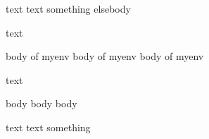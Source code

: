 text text
\if
	something
\else
	elsebody
\fi

text
\begin{myenv}
	body of myenv
	body of myenv
	body of myenv
\end{myenv}

text

\begin{anotherenv}
	body
	body
	body
\end{anotherenv}

text text
\if
	something
\fi
